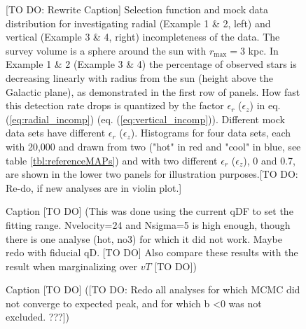 
\begin{figure}
\caption{[TO DO: Rewrite Caption] Selection function and mock data distribution for investigating radial (Example 1 \& 2, left) and vertical (Example 3 \& 4, right) incompleteness of the data. The survey volume is a sphere around the sun with $r_\text{max} = 3$ kpc. In Example 1 \& 2 (Example 3 \& 4) the percentage of observed stars is decreasing linearly with radius from the sun (height above the Galactic plane), as demonstrated in the first row of panels. How fast this detection rate drops is quantized by the factor $\epsilon_r$ ($\epsilon_z$) in eq. (\ref{eq:radial_incomp}) (eq. (\ref{eq:vertical_incomp})). Different mock data sets have different $\epsilon_r$ ($\epsilon_z$). Histograms for four data sets, each with 20,000 and drawn from two \MAPs ("hot" in red and "cool" in blue, see table \ref{tbl:referenceMAPs}) and with two different $\epsilon_r$ ($\epsilon_z$), 0 and 0.7, are shown in the lower two panels for illustration purposes.[TO DO: Re-do, if new analyses are in violin plot.]} 
\label{fig:incompZ_mockdata}
\end{figure}


\begin{figure}
\caption{Caption [TO DO] (This was done using the current qDF to set the fitting range. Nvelocity=24 and Nsigma=5 is high enough, though there is one analyse (hot, no3) for which it did not work. Maybe redo with fiducial qD. [TO DO] Also compare these results with the result when marginalizing over $vT$ [TO DO])} 
\label{fig:isoSphFlexIncompZ_violins}
\end{figure}

\begin{figure}
\caption{Caption [TO DO] ([TO DO: Redo all analyses for which MCMC did not converge to expected peak, and for which b <0 was not excluded. ???])} 
\label{fig:isoSphFlexIncomp_marginal_violins}
\end{figure}